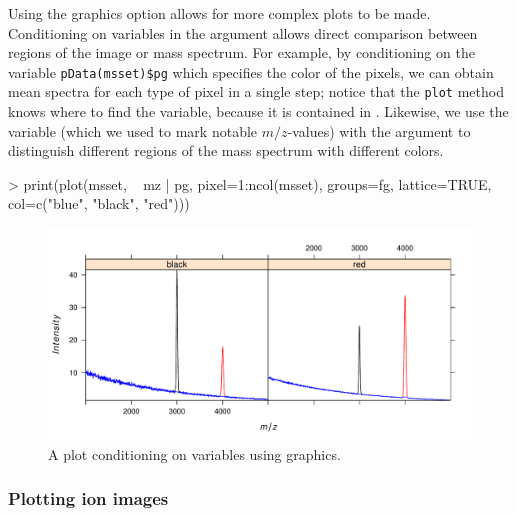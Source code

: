 \documentclass[a4paper]{article}
\begin{document}
Using the  graphics option allows for more complex plots to be made. Conditioning on variables in the  argument allows direct comparison between regions of the image or mass spectrum. For example, by conditioning on the variable \verb|pData(msset)$pg| which specifies the color of the pixels, we can obtain mean spectra for each type of pixel in a single step; notice that the \verb|plot| method knows where to find the  variable, because it is contained in . Likewise, we use the  variable (which we used to mark notable $m/z$-values) with the argument  to distinguish different regions of the mass spectrum with different colors.
\begin{Schunk}
\begin{Sinput}
> print(plot(msset, ~ mz | pg, pixel=1:ncol(msset), groups=fg, lattice=TRUE, col=c("blue", "black", "red")))
\end{Sinput}
\end{Schunk}
\begin{figure}
\begin{center}
\includegraphics{Cardinal-demo-026}
\caption{\small A plot conditioning on variables using  graphics.}
\end{center}
\end{figure}

\subsubsection{Plotting ion images}
\end{document}
